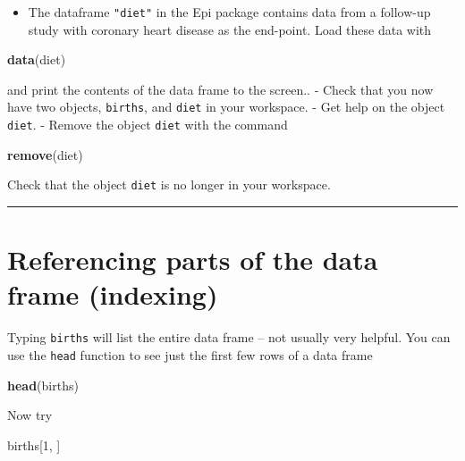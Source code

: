 \documentclass[
]{book}
\newenvironment{Shaded}{\begin{snugshade}}{\end{snugshade}}
\newcommand{\DecValTok}[1]{\textcolor[rgb]{0.00,0.00,0.81}{#1}}
\newcommand{\FunctionTok}[1]{\textcolor[rgb]{0.13,0.29,0.53}{\textbf{#1}}}
\newcommand{\NormalTok}[1]{#1}
\providecommand{\tightlist}{%
  \setlength{\itemsep}{0pt}\setlength{\parskip}{0pt}}
\begin{document}
\begin{itemize}
\tightlist
\item
  The dataframe \texttt{"diet"} in the Epi package contains data from a follow-up study with
  coronary heart disease as the end-point. Load these data with
\end{itemize}

\begin{Shaded}
\begin{Highlighting}[]
\FunctionTok{data}\NormalTok{(diet)}
\end{Highlighting}
\end{Shaded}

and print the contents of the data frame to the screen..
- Check that you now have two objects, \texttt{births}, and \texttt{diet} in your workspace.
- Get help on the object \texttt{diet}.
- Remove the object \texttt{diet} with the command

\begin{Shaded}
\begin{Highlighting}[]
\FunctionTok{remove}\NormalTok{(diet)}
\end{Highlighting}
\end{Shaded}

Check that the object \texttt{diet} is no longer in your workspace.

\begin{center}\rule{0.5\linewidth}{0.5pt}\end{center}

\section{Referencing parts of the data frame (indexing)}\label{referencing-parts-of-the-data-frame-indexing}

Typing \texttt{births} will list the entire data frame -- not usually
very helpful. You can use the \texttt{head} function to see just the
first few rows of a data frame

\begin{Shaded}
\begin{Highlighting}[]
\FunctionTok{head}\NormalTok{(births)}
\end{Highlighting}
\end{Shaded}

Now try

\begin{Shaded}
\begin{Highlighting}[]
\NormalTok{births[}\DecValTok{1}\NormalTok{, ]}
\end{Highlighting}
\end{Shaded}
\end{document}
